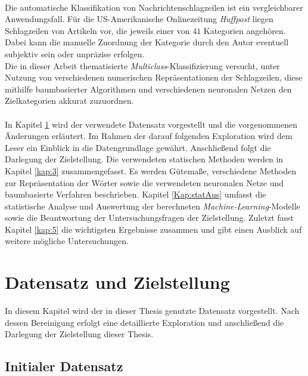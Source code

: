 \documentclass[a4paper,11pt]{article}
\begin{document}
\\
Die automatische Klassifikation von Nachrichtenschlagzeilen ist ein vergleichbarer Anwendungsfall. Für die US-Amerikanische Onlinezeitung \textit{Huffpost} liegen Schlagzeilen von Artikeln vor, die jeweils einer von $41$ Kategorien angehören. Dabei kann die manuelle Zuordnung der Kategorie durch den Autor eventuell subjektiv sein oder unpräzise erfolgen. \\
Die in dieser Arbeit thematisierte \textit{Multiclass}-Klassifizierung versucht, unter Nutzung von verschiedenen numerischen Repräsentationen der Schlagzeilen, diese mithilfe baumbasierter Algorithmen und verschiedenen neuronalen Netzen den Zielkategorien akkurat zuzuordnen.\\
\\
In Kapitel \ref{kap:2} wird der verwendete Datensatz vorgestellt und die vorgenommenen Änderungen erläutert. Im Rahmen der darauf folgenden Exploration wird dem Leser ein Einblick in die Datengrundlage gewährt.
Anschließend folgt die Darlegung der Zielstellung. Die verwendeten statischen Methoden werden in Kapitel \ref{kap:3} zusammengefasst. Es werden Gütemaße, verschiedene Methoden zur Repräsentation der Wörter sowie die verwendeten neuronalen Netze und baumbasierte Verfahren beschrieben. Kapitel \ref{Kap:statAus} umfasst die statistische Analyse und Auswertung der berechneten \textit{Machine-Learning}-Modelle sowie die Beantwortung der Untersuchungsfragen der Zielstellung. Zuletzt fasst Kapitel \ref{kap:5} die wichtigsten Ergebnisse zusammen und gibt einen Ausblick auf weitere mögliche Untersuchungen.

\newpage

\section{Datensatz und Zielstellung}\label{kap:2}

In diesem Kapitel wird der in dieser Thesis genutzte Datensatz vorgestellt. Nach dessen Bereinigung erfolgt eine detaillierte Exploration und anschließend die Darlegung der Zielstellung dieser Thesis.


\subsection{Initialer Datensatz}
\end{document}

